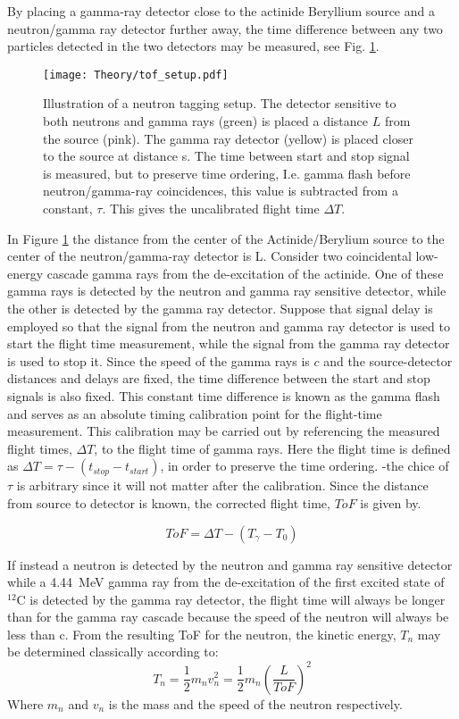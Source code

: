 \documentclass[main.tex]{subfiles}
\begin{document}
By placing a gamma-ray detector close to the actinide Beryllium source and a neutron/gamma ray detector further away, the time difference between any two particles detected in the two detectors may be measured, see Fig. \ref{fig:tof_setup}. 
\begin{figure}[t]
    \centering
        \texttt{[image: Theory/tof\_setup.pdf]}
        \caption[Illustration of a neutron tagging setup]{Illustration of a neutron tagging setup. The detector sensitive to both neutrons and gamma rays (green) is placed a distance $L$ from the source (pink). The gamma ray detector (yellow) is placed closer to the source at distance s. The time between start and stop signal is measured, but to preserve time ordering, I.e. gamma flash before neutron/gamma-ray coincidences, this value is subtracted from a constant, $\tau$. This gives the uncalibrated flight time $\Delta T$.}
    \label{fig:tof_setup} 
\end{figure}
In Figure \ref{fig:tof_setup} the distance from the center of the Actinide/Berylium source to the center of the neutron/gamma-ray detector is L. Consider two coincidental low-energy cascade gamma rays from the de-excitation of the actinide. One of these gamma rays is detected by the neutron and gamma ray sensitive detector, while the other is detected by the gamma ray detector. Suppose that signal delay is employed so that the signal from the neutron and gamma ray detector is used to start the flight time measurement, while the signal from the gamma ray detector is used to stop it. Since the speed of the gamma rays is $c$ and the source-detector distances and delays are fixed, the time difference between the start and stop signals is also fixed. This constant time difference is known as the gamma flash and serves as an absolute timing calibration point for the flight-time measurement. This calibration may be carried out by referencing the measured flight times, $\Delta T$, to the flight time of gamma rays. Here the flight time is defined as $\Delta T=\tau -(t_{stop}-t_{start})$, in order to preserve the time ordering. -the chice of $\tau$ is arbitrary since it will not matter after the calibration. Since the distance from source to detector is known, the corrected flight time, $ToF$ is given by.

\begin{equation}
	ToF = \Delta T -(T_\gamma - T_0)
\end{equation}

If instead a neutron is detected by the neutron and gamma ray sensitive detector while a \SI{4.44}{\MeV} gamma ray from the de-excitation of the first excited state of $^\textrm{12}$C is detected by the gamma ray detector, the flight time will always be longer than for the gamma ray cascade because the speed of the neutron will always be less than c. From the resulting ToF for the neutron, the kinetic energy, $T_n$ may be determined classically according to:
\begin{equation}
	T_n = \frac{1}{2} m_n v_n^2 = \frac{1}{2}m_n\left(\frac{L}{ToF}\right)^2
\end{equation}
Where $m_n$ and $v_n$ is the mass and the speed of the neutron respectively.
\end{document}
